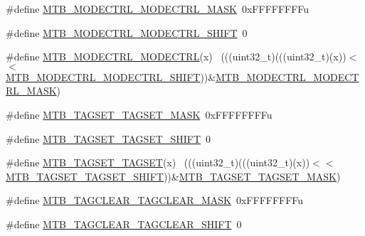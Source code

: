 \begin{DoxyCompactItemize}
\item 
\#define \hyperlink{group___m_t_b___register___masks_ga1d66deff1d032af57ab9b808a240fa3a}{M\+T\+B\+\_\+\+M\+O\+D\+E\+C\+T\+R\+L\+\_\+\+M\+O\+D\+E\+C\+T\+R\+L\+\_\+\+M\+A\+SK}~0x\+F\+F\+F\+F\+F\+F\+F\+Fu
\item 
\#define \hyperlink{group___m_t_b___register___masks_gaa771d72e2a22b472cb0f5daceeef22bb}{M\+T\+B\+\_\+\+M\+O\+D\+E\+C\+T\+R\+L\+\_\+\+M\+O\+D\+E\+C\+T\+R\+L\+\_\+\+S\+H\+I\+FT}~0
\item 
\#define \hyperlink{group___m_t_b___register___masks_gaa1b6a675209b1acc09a8eccc95797b29}{M\+T\+B\+\_\+\+M\+O\+D\+E\+C\+T\+R\+L\+\_\+\+M\+O\+D\+E\+C\+T\+RL}(x)                              ~(((uint32\+\_\+t)(((uint32\+\_\+t)(x))$<$$<$\hyperlink{group___m_t_b___register___masks_gaa771d72e2a22b472cb0f5daceeef22bb}{M\+T\+B\+\_\+\+M\+O\+D\+E\+C\+T\+R\+L\+\_\+\+M\+O\+D\+E\+C\+T\+R\+L\+\_\+\+S\+H\+I\+FT}))\&\hyperlink{group___m_t_b___register___masks_ga1d66deff1d032af57ab9b808a240fa3a}{M\+T\+B\+\_\+\+M\+O\+D\+E\+C\+T\+R\+L\+\_\+\+M\+O\+D\+E\+C\+T\+R\+L\+\_\+\+M\+A\+SK})
\item 
\#define \hyperlink{group___m_t_b___register___masks_gae10888ce190a167551d534dac7019f9d}{M\+T\+B\+\_\+\+T\+A\+G\+S\+E\+T\+\_\+\+T\+A\+G\+S\+E\+T\+\_\+\+M\+A\+SK}~0x\+F\+F\+F\+F\+F\+F\+F\+Fu
\item 
\#define \hyperlink{group___m_t_b___register___masks_gac7d7e704f5b16991586fea0dc061bc3d}{M\+T\+B\+\_\+\+T\+A\+G\+S\+E\+T\+\_\+\+T\+A\+G\+S\+E\+T\+\_\+\+S\+H\+I\+FT}~0
\item 
\#define \hyperlink{group___m_t_b___register___masks_ga2ad07207b357ce17267bd15b9f964873}{M\+T\+B\+\_\+\+T\+A\+G\+S\+E\+T\+\_\+\+T\+A\+G\+S\+ET}(x)                                      ~(((uint32\+\_\+t)(((uint32\+\_\+t)(x))$<$$<$\hyperlink{group___m_t_b___register___masks_gac7d7e704f5b16991586fea0dc061bc3d}{M\+T\+B\+\_\+\+T\+A\+G\+S\+E\+T\+\_\+\+T\+A\+G\+S\+E\+T\+\_\+\+S\+H\+I\+FT}))\&\hyperlink{group___m_t_b___register___masks_gae10888ce190a167551d534dac7019f9d}{M\+T\+B\+\_\+\+T\+A\+G\+S\+E\+T\+\_\+\+T\+A\+G\+S\+E\+T\+\_\+\+M\+A\+SK})
\item 
\#define \hyperlink{group___m_t_b___register___masks_ga50dabf07ab4f88615242b68c0466aab0}{M\+T\+B\+\_\+\+T\+A\+G\+C\+L\+E\+A\+R\+\_\+\+T\+A\+G\+C\+L\+E\+A\+R\+\_\+\+M\+A\+SK}~0x\+F\+F\+F\+F\+F\+F\+F\+Fu
\item 
\#define \hyperlink{group___m_t_b___register___masks_gac1ba97e3448e183a4d00b63060786290}{M\+T\+B\+\_\+\+T\+A\+G\+C\+L\+E\+A\+R\+\_\+\+T\+A\+G\+C\+L\+E\+A\+R\+\_\+\+S\+H\+I\+FT}~0

\end{DoxyCompactItemize}
